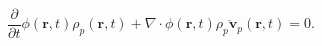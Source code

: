 \begin{equation}
\frac{\partial}{\partial t}\phi (\mathbf{r},t) \rho_p (\mathbf{r},t) +
\nabla \cdot \phi (\mathbf{r},t) \overline{\rho_p
\mathbf{v}_p}(\mathbf{r},t)  = 0.
 \label{eq:eomaveraged}
\end{equation}
